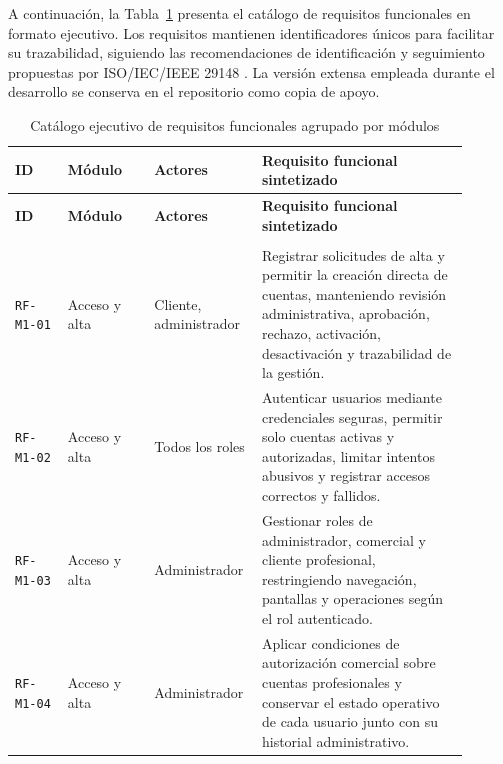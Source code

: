A continuación, la Tabla~\ref{tab:functional-requirements-executive} presenta el catálogo de requisitos funcionales en formato ejecutivo. Los requisitos mantienen identificadores únicos para facilitar su trazabilidad, siguiendo las recomendaciones de identificación y seguimiento propuestas por ISO/IEC/IEEE 29148 \cite{ieee29148}. La versión extensa empleada durante el desarrollo se conserva en el repositorio como copia de apoyo.

{\scriptsize
\setlength{\tabcolsep}{3pt}
\renewcommand{\arraystretch}{1.13}
\newcommand{\RFModuleHeader}[1]{%
\hline\hline
\multicolumn{4}{|>{\RaggedRight\arraybackslash}p{0.94\linewidth}|}{\textbf{#1}}\\
\hline\hline
}
\begin{longtable}{|>{\RaggedRight\arraybackslash}p{0.11\linewidth}|>{\RaggedRight\arraybackslash}p{0.18\linewidth}|>{\RaggedRight\arraybackslash}p{0.18\linewidth}|>{\RaggedRight\arraybackslash}p{0.43\linewidth}|}
\caption{Catálogo ejecutivo de requisitos funcionales agrupado por módulos}
\label{tab:functional-requirements-executive}\\
\hline
\textbf{ID} & \textbf{Módulo} & \textbf{Actores} & \textbf{Requisito funcional sintetizado} \\
\hline
\endfirsthead
\hline
\textbf{ID} & \textbf{Módulo} & \textbf{Actores} & \textbf{Requisito funcional sintetizado} \\
\hline
\endhead
\RFModuleHeader{M1. Acceso, alta y seguridad de cuentas}
\texttt{RF-M1-01} & Acceso y alta & Cliente, administrador & Registrar solicitudes de alta y permitir la creación directa de cuentas, manteniendo revisión administrativa, aprobación, rechazo, activación, desactivación y trazabilidad de la gestión. \\
\hline
\texttt{RF-M1-02} & Acceso y alta & Todos los roles & Autenticar usuarios mediante credenciales seguras, permitir solo cuentas activas y autorizadas, limitar intentos abusivos y registrar accesos correctos y fallidos. \\
\hline
\texttt{RF-M1-03} & Acceso y alta & Administrador & Gestionar roles de administrador, comercial y cliente profesional, restringiendo navegación, pantallas y operaciones según el rol autenticado. \\
\hline
\texttt{RF-M1-04} & Acceso y alta & Administrador & Aplicar condiciones de autorización comercial sobre cuentas profesionales y conservar el estado operativo de cada usuario junto con su historial administrativo. \\
\hline

\end{longtable}}
